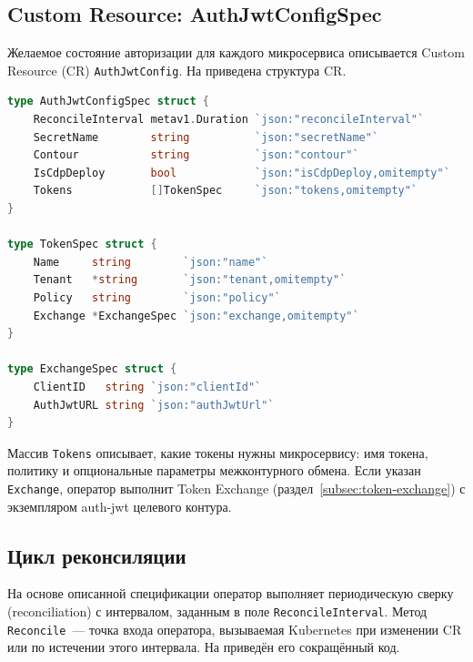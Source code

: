 \subsection{Custom Resource: AuthJwtConfigSpec}\label{subsec:cr-spec}

Желаемое состояние авторизации для каждого микросервиса
описывается Custom Resource (CR) \texttt{AuthJwtConfig}.
На  приведена структура CR.

\begin{lstlisting}[language=Go]
type AuthJwtConfigSpec struct {
    ReconcileInterval metav1.Duration `json:"reconcileInterval"`
    SecretName        string          `json:"secretName"`
    Contour           string          `json:"contour"`
    IsCdpDeploy       bool            `json:"isCdpDeploy,omitempty"`
    Tokens            []TokenSpec     `json:"tokens,omitempty"`
}

type TokenSpec struct {
    Name     string        `json:"name"`
    Tenant   *string       `json:"tenant,omitempty"`
    Policy   string        `json:"policy"`
    Exchange *ExchangeSpec `json:"exchange,omitempty"`
}

type ExchangeSpec struct {
    ClientID   string `json:"clientId"`
    AuthJwtURL string `json:"authJwtUrl"`
}
\end{lstlisting}

Массив \texttt{Tokens} описывает, какие токены нужны микросервису:
имя токена, политику и опциональные параметры межконтурного обмена.
Если указан \texttt{Exchange}, оператор выполнит Token Exchange
(раздел~\ref{subsec:token-exchange})
с экземпляром auth-jwt целевого контура.

\subsection{Цикл реконсиляции}\label{subsec:reconcile}

На основе описанной спецификации
оператор выполняет периодическую сверку (reconciliation)
с интервалом, заданным в поле \texttt{ReconcileInterval}.
Метод \texttt{Reconcile}~--- точка входа оператора,
вызываемая Kubernetes при изменении CR
или по истечении этого интервала.
На  приведён его сокращённый код.

